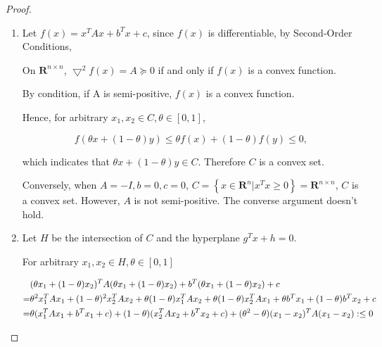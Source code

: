 \begin{proof}
\par{~}
\begin{enumerate}

\item{

Let $f(x) = x^{T} A x+b^{T} x+c$, since $f(x)$ is differentiable, by Second-Order Conditions,

On $\mathbf{R}^{n\times n}$, $\bigtriangledown^2 f(x) = A \succeq 0$ if and only if $f(x)$ is a convex function.

By condition, if A is semi-positive, $f(x)$ is a convex function.

Hence, for arbitrary $x_1, x_2 \in C, \theta \in [0,1]$,

$$ f(\theta x + (1-\theta) y) \leq \theta f(x) + (1-\theta)f(y) \leq 0 ,$$

which indicates that $ \theta x + (1-\theta) y \in C$. Therefore $C$ is a convex set.

Conversely, when $A = - I, b = 0, c = 0$, $C=\left\{x \in \mathbf{R}^{n} | x^{T}x \geq 0\right\} = \mathbf{R}^{n\times n}$, $C$ is a convex set. However, $A$ is not semi-positive. The converse argument doesn't hold.
}
\item{

Let $H$ be the intersection of $C$ and the hyperplane $g^{T} x+h=0$.

For arbitrary $x_1, x_2 \in H, \theta \in \left[0,1\right] $

\begin{equation}
\begin{aligned}
 &(\theta x_1 + (1-\theta) x_2)^T A (\theta x_1 + (1-\theta)x_2) + b^T (\theta x_1 + (1-\theta)x_2) + c \\
= & \theta^2 x_1^T A x_1 + (1-\theta)^2 x_2^T A x_2 + \theta(1-\theta) x_1^T A x_2 + \theta (1-\theta) x_2^T A x_1 + \theta b^T x_1 + (1-\theta) b^T x_2 + c \\
= & \theta (x_1^T A x_1 + b^T x_1 + c) + (1-\theta)(x_2^T A x_2 + b^T x_2 + c) + (\theta^2-\theta)(x_1-x_2)^T A (x_1-x_2) :\leq 0
\end{aligned}
\end{equation}

}
\end{enumerate}
\end{proof}
